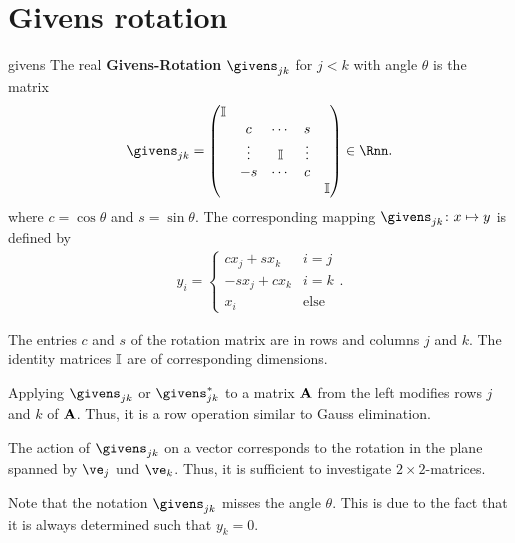 \section{Givens rotation}

\begin{Definition}{givens}
  The real \textbf{Givens-Rotation}
  $\givens_{jk}$ for $j<k$ with angle $\theta$ is the matrix
  \begin{gather}
      \givens_{jk} =
    \begin{pmatrix}
      \id \\
      &c&\cdots&s\\
      &\vdots&\id &\vdots\\
      &-s&\cdots&c\\
      &&&&\id
    \end{pmatrix}
    \in\Rnn.
  \end{gather}
    where $c = \cos\theta$ and $s = \sin\theta$.
  The corresponding mapping $\givens_{jk}\colon x\mapsto y$ is defined by
  \begin{gather}
    y_i =
    \begin{cases}
      c x_j + s x_k & i=j\\
      -s x_j + c x_k & i=k\\
      x_i &\text{else}
    \end{cases}.
  \end{gather}
\end{Definition}

\begin{remark}
  The entries $c$ and $s$ of the rotation matrix are in rows and
  columns $j$ and $k$.  The identity matrices $\mathbb I$ are of
  corresponding dimensions.

  Applying $\givens_{jk}$ or $\givens_{jk}^*$ to a matrix $\mathbf A$ from
  the left modifies rows $j$ and $k$ of $\mathbf A$. Thus, it is a row
  operation similar to Gauss elimination.

  The action of $\givens_{jk}$ on a vector corresponds to the rotation
  in the plane spanned by $\ve_j$ und $\ve_k$. Thus, it is sufficient
  to investigate $2\times2$-matrices.

  Note that the notation $\givens_{jk}$ misses the angle $\theta$. This
  is due to the fact that it is always determined such that $y_k=0$.
\end{remark}

